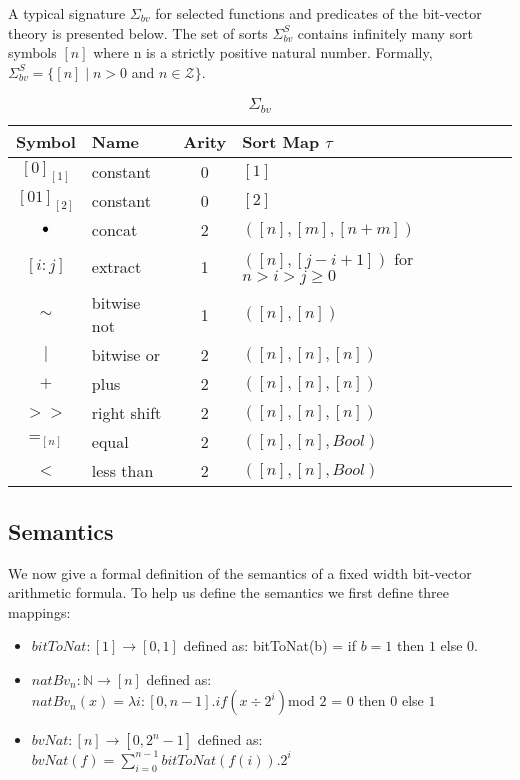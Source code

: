 A typical signature $\Sigma_{bv}$ for selected functions and predicates of the bit-vector theory is presented below. The set of sorts $\Sigma_{bv}^S$ contains
infinitely many sort symbols $[n]$ where n is a strictly positive natural number. Formally, $\Sigma_{bv}^S = \{[n] \mid n > 0 $ and $ n \in \mathcal{Z}\}$.
\begin{table}[h]
\centering
\caption{$\Sigma_{bv}$}
\begin{tabular}{c | l | c | l }
Symbol & Name & Arity & Sort Map $\tau$  \\
\hline \hline
$[0]_{[1]}$ & constant & 0 & $[1]$  \\
$[01]_{[2]}$ & constant & 0 & $[2]$  \\ 
$\mathop{\bullet}$ & concat & 2 & $([n],[m],[n+m])$ \\
$[i:j]$ & extract & 1 & $([n],[j-i+1])$ for $n > i > j \ge 0$
 \\ 
$\sim$ & bitwise not & 1 & $([n],[n])$  \\
$\mid$ & bitwise or & 2 & $([n],[n],[n])$ \\
$+$ & plus & 2 & $([n],[n],[n])$ \\
$>>$ & right shift & 2 & $([n],[n],[n])$\\
$=_{[n]}$ & equal & 2 & $([n],[n],Bool)$  \\
$<$ & less than & 2 & $([n],[n],Bool)$ \\

\end{tabular}
\end{table}

\subsection{Semantics}

We now give a formal definition of the semantics of a fixed width bit-vector arithmetic formula. To help us define the semantics we first define three mappings:
\begin{itemize}
\item $bitToNat:[1] \rightarrow [0,1]$ defined as:
bitToNat(b) = if $b = 1$ then $1$ else $0$.
\item $natBv_n : \mathbb{N} \rightarrow [n]$ defined as: \\
$natBv_n(x) = \lambda i : [0, n-1].if (x \div 2^i ) $mod $2$ = $0$ then $0$ else $1$
\item $bvNat : [n]\rightarrow[0, 2^n-1]$ defined as: 
$bvNat(f) = \sum^{n-1}_{i=0} bitToNat(f(i)).2^i$
\end{itemize}

